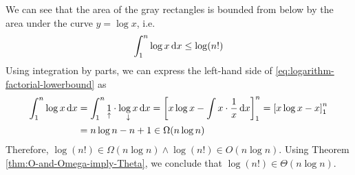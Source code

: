 \begin{example}
\begin{center}
      \end{center}

    We can see that the area of the gray rectangles is bounded from below by the area under the curve $y = \log x$, i.e.
    \begin{equation}
    \label{eq:logarithm-factorial-lowerbound}
    \int_1^n \log x \, \mathrm{d} x \leq \log(n!)
    \end{equation}
    Using integration by parts, we can express the left-hand side of \eqref{eq:logarithm-factorial-lowerbound} as
    \begin{align*}
        \int_1^n \log x \, \mathrm{d} x &= \int_1^n \underset{\uparrow}{1} \cdot \underset{\downarrow}{\log x} \, \mathrm{d} x = \left[ x \log x - \int x \cdot \frac{1}{x} \, \mathrm{d} x \right]_1^n = \left[ x \log x - x \right]_1^n \\
        &= n \log n - n + 1 \in \Omega(n \log n)
    \end{align*}
    Therefore, $\log(n!) \in \Omega(n \log n) \wedge \log(n!) \in O(n \log n)$.
    Using Theorem \ref{thm:O-and-Omega-imply-Theta}, we conclude that $\log(n!) \in \Theta(n \log n)$.
\end{example}

